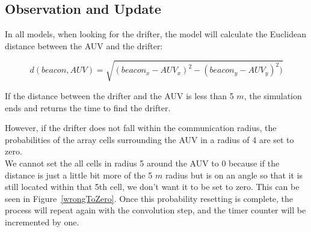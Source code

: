 \documentclass[a4paper, 11pt]{article} %
\begin{document}
\subsection*{Observation and Update}

In all models, when looking for the drifter, the model will calculate the Euclidean distance between the AUV and the drifter:

\begin{equation*}
d(beacon,AUV) = \sqrt{(beacon_{x} - AUV_{x})^{2} - (beacon_{y} - AUV_{y})^{2})}
\end{equation*} 

\noindent If the distance between the drifter and the AUV is less than 5 $m$, the simulation ends and returns the time to find the drifter. 

\noindent However, if the drifter does not fall within the communication radius, the probabilities of the array cells surrounding the AUV in a radius of 4 are set to zero. \\

\noindent We cannot set the all cells in radius 5 around the AUV to 0 because if the distance is just a little bit more of the 5 $m$ radius but is on an angle so that it is still located within that 5th cell, we don't want it to be set to zero. This can be seen in Figure~\ref{wrongToZero}. Once this probability resetting is complete, the process will repeat again with the convolution step, and the timer counter will be incremented by one.
\end{document}

